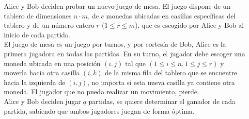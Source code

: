 %

Alice y Bob deciden probar un nuevo juego de mesa. El juego dispone de un tablero de dimensiones $n \cdot m$, de $c$ monedas ubicadas en casillas específicas del tablero y de un número entero $r$ ($1 \le r \le m$), que es escogido por Alice y Bob al inicio de cada partida.\\

El juego de mesa es un juego por turnos, y por cortesía de Bob, Alice es la primera jugadora en todas las partidas. En su turno, el jugador debe escoger una moneda ubicada en una posición $(i, j)$ tal que $(1 \le i \le n, 1 \le j \le r)$ y moverla hacia otra casilla $(i, k)$ de la misma fila del tablero que se encuentre hacia la izquierda de $(i, j)$, no importa si esta nueva casilla ya contiene otra moneda. El jugador que no pueda realizar un movimiento, pierde.\\

Alice y Bob deciden jugar $q$ partidas, se quiere determinar el ganador de cada partida, sabiendo que ambos jugadores juegan de forma óptima.




\sampleio
